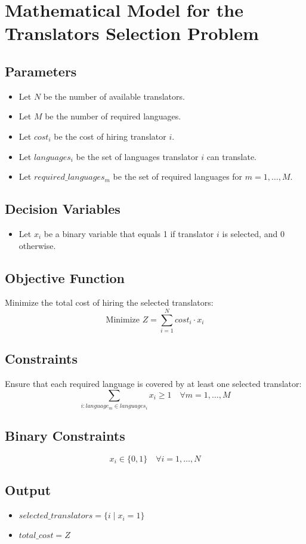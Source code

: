 \documentclass{article}
\begin{document}
\section*{Mathematical Model for the Translators Selection Problem}

\subsection*{Parameters}
\begin{itemize}
    \item Let \( N \) be the number of available translators.
    \item Let \( M \) be the number of required languages.
    \item Let \( cost_i \) be the cost of hiring translator \( i \).
    \item Let \( languages_i \) be the set of languages translator \( i \) can translate.
    \item Let \( required\_languages_m \) be the set of required languages for \( m = 1, \ldots, M \).
\end{itemize}

\subsection*{Decision Variables}
\begin{itemize}
    \item Let \( x_i \) be a binary variable that equals 1 if translator \( i \) is selected, and 0 otherwise.
\end{itemize}

\subsection*{Objective Function}
Minimize the total cost of hiring the selected translators:
\[
\text{Minimize } Z = \sum_{i=1}^{N} cost_i \cdot x_i
\]

\subsection*{Constraints}
Ensure that each required language is covered by at least one selected translator:
\[
\sum_{i: language_m \in languages_i} x_i \geq 1 \quad \forall m = 1, \ldots, M
\]

\subsection*{Binary Constraints}
\[
x_i \in \{0, 1\} \quad \forall i = 1, \ldots, N
\]

\subsection*{Output}
\begin{itemize}
    \item \( selected\_translators = \{i \mid x_i = 1\} \)
    \item \( total\_cost = Z \)
\end{itemize}
\end{document}
